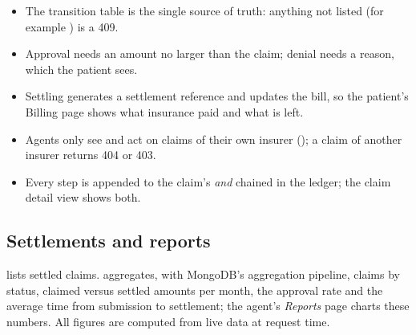 \begin{howto}
\begin{itemize}
  \item The transition table is the single source of truth: anything not listed
    (for example ) is a 409.
  \item Approval needs an amount no larger than the claim; denial needs a
    reason, which the patient sees.
  \item Settling generates a settlement reference and updates the bill, so the
    patient's Billing page shows what insurance paid and what is left.
  \item Agents only see and act on claims of their own insurer
    (); a claim of another insurer returns 404 or 403.
  \item Every step is appended to the claim's  \emph{and} chained
    in the ledger; the claim detail view shows both.
\end{itemize}
\end{howto}

\subsection{Settlements and reports}

 lists settled claims. 
aggregates, with MongoDB's aggregation pipeline, claims by status, claimed versus
settled amounts per month, the approval rate and the average time from
submission to settlement; the agent's \emph{Reports} page charts these numbers.
All figures are computed from live data at request time.
